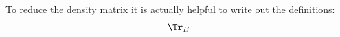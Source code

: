To reduce the density matrix it is actually helpful to write out the definitions:
\begin{align}
\Tr_B
\end{align}